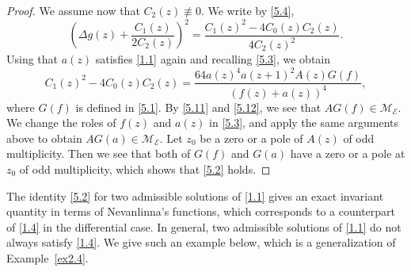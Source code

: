 \documentclass{amsart}
\begin{document}
\begin{proof}
We assume now that  $C_2(z)\not\equiv0$.
We write by \eqref{5.4},
\begin{equation}
\left(\Delta g(z)+\frac{C_1(z)}{2C_2(z)}\right)^2=\frac{C_1(z)^2-4C_0(z)C_2(z)}{4C_2(z)^2}.\label{5.11}
\end{equation}
Using that $a(z)$ satisfies \eqref{1.1} again and recalling \eqref{5.3}, we obtain
\begin{equation}
C_1(z)^2-4C_0(z)C_2(z)=\frac{64a(z)^4a(z+1)^2A(z)G(f)}{(f(z)+a(z))^4},\label{5.12}
\end{equation}
where $G(f)$ is defined in \eqref{5.1}.
By \eqref{5.11} and \eqref{5.12}, we see that $AG(f)\in \mathcal{M_{\text{E}}}$.
We change the roles of $f(z)$ and $a(z)$ in \eqref{5.3}, and apply the same arguments above to obtain $AG(a)\in \mathcal{M_{\text{E}}}$. Let $z_0$ be a zero or a pole of $A(z)$
of odd multiplicity. Then we see that both of $G(f)$ and $G(a)$ have a zero or a pole
at $z_0$ of odd multiplicity, which shows that \eqref{5.2} holds.
\end{proof}

The identity \eqref{5.2} for two admissible solutions of \eqref{1.1} gives an exact invariant quantity in terms of Nevanlinna's functions, which corresponds to a counterpart of \eqref{1.4} in the differential case. In general, two admissible solutions of \eqref{1.1} do not always satisfy \eqref{1.4}. We give such an example below, which is a generalization of Example~\ref{ex2.4}.
\end{document}
